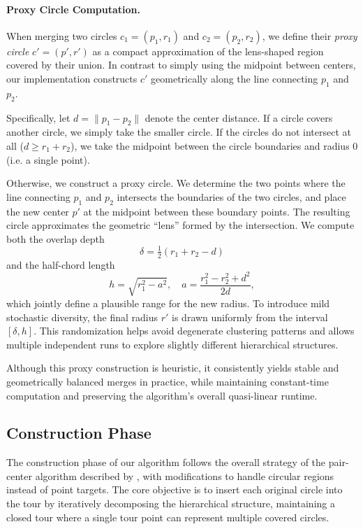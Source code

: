\documentclass[11pt]{article}
\begin{document}
\paragraph{Proxy Circle Computation.}
When merging two circles $c_1 = (p_1, r_1)$ and $c_2 = (p_2, r_2)$, we define their \emph{proxy circle} $c' = (p', r')$ as a compact approximation of the lens-shaped region covered by their union. In contrast to simply using the midpoint between centers, our implementation constructs $c'$ geometrically along the line connecting $p_1$ and $p_2$.

Specifically, let $d = \|p_1 - p_2\|$ denote the center distance. If a circle covers another circle, we simply take the smaller circle. If the circles do not intersect at all ($d \geq r_1 + r_2$), we take the midpoint between the circle boundaries and radius $0$ (i.e. a single point).

Otherwise, we construct a proxy circle. We determine the two points where the line connecting $p_1$ and $p_2$ intersects the boundaries of the two circles, and place the new center $p'$ at the midpoint between these boundary points. The resulting circle approximates the geometric ``lens'' formed by the intersection. We compute both the overlap depth
\[
\delta = \tfrac{1}{2}(r_1 + r_2 - d)
\]
and the half-chord length
\[
h = \sqrt{r_1^2 - a^2}, \quad a = \frac{r_1^2 - r_2^2 + d^2}{2d},
\]
which jointly define a plausible range for the new radius. To introduce mild stochastic diversity, the final radius $r'$ is drawn uniformly from the interval $[\delta, h]$. This randomization helps avoid degenerate clustering patterns and allows multiple independent runs to explore slightly different hierarchical structures.

Although this proxy construction is heuristic, it consistently yields stable and geometrically balanced merges in practice, while maintaining constant-time computation and preserving the algorithm's overall quasi-linear runtime.

\subsection{Construction Phase}
The construction phase of our algorithm follows the overall strategy of the pair-center algorithm described by \textcite{Formella2024}, with modifications to handle circular regions instead of point targets. The core objective is to insert each original circle into the tour by iteratively decomposing the hierarchical structure, maintaining a closed tour where a single tour point can represent multiple covered circles.
\end{document}
